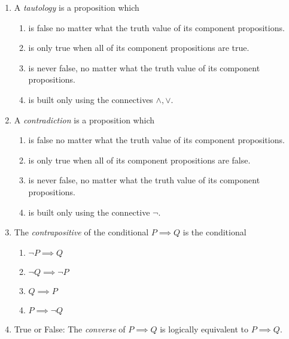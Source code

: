 \pagestyle{empty}


\begin{enumerate}
  \item A \emph{tautology} is a proposition which \underline{\phantom{is always true}\qquad\qquad}
  \begin{enumerate}
      \item is false no matter what the truth value of its component propositions.
      \item is only true when all of its component propositions are true.
      \item is never false, no matter what the truth value of its component propositions.
      \item is built only using the connectives $\land, \lor$.
  \end{enumerate}
  
  \item A \emph{contradiction} is a proposition which \underline{\phantom{is always false}\qquad\qquad}
  \begin{enumerate}
      \item is false no matter what the truth value of its component propositions.
      \item is only true when all of its component propositions are false.
      \item is never false, no matter what the truth value of its component propositions.
      \item is built only using the connective $\neg$.
  \end{enumerate}
  
  \item The \emph{contrapositive} of the conditional $P\implies Q$ is the conditional \underline{\phantom{$\not Q\implies\not P$}\qquad\qquad}
  \begin{enumerate}
      \item $\neg P \implies Q$
      \item $\neg Q \implies \neg P$
      \item $Q \implies P$
      \item $P \implies \neg Q$
  \end{enumerate}

  \item True or False: The \emph{converse} of $P\implies Q$ is logically equivalent to $P\implies Q$.
  

\end{enumerate}
